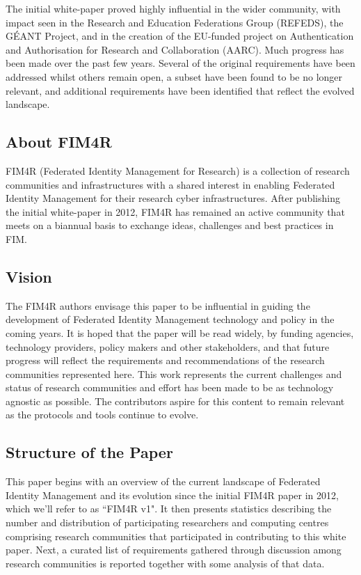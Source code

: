 \documentclass[fleqn,10pt]{wlscirep}
\begin{document}
{The initial white-paper proved highly influential in the wider community, with impact seen in the Research and Education Federations Group (REFEDS)\cite{refeds}, the GÉANT Project\cite{GN4}, and in the creation of the EU-funded project on Authentication and Authorisation for Research and Collaboration (AARC)\cite{aarc}. Much progress has been made over the past few years. Several of the original requirements have been addressed whilst others remain open, a subset have been found to be no longer relevant, and additional requirements have been identified that reflect the evolved landscape. 

\subsection{About FIM4R}
FIM4R\cite{fim4rweb} (Federated Identity Management for Research) is a collection of research communities and infrastructures with a shared interest in enabling Federated Identity Management for their research cyber infrastructures. After publishing the initial white-paper in 2012, FIM4R has remained an active community that meets on a biannual basis to exchange ideas, challenges and best practices in FIM.  

\subsection{Vision}
The FIM4R authors envisage this paper to be influential in guiding the development of Federated Identity Management technology and policy in the coming years. It is hoped that the paper will be read widely, by funding agencies, technology providers, policy makers and other stakeholders, and that future progress will reflect the requirements and recommendations of the research communities represented here. This work represents the current challenges and status of research communities and effort has been made to be as technology agnostic as possible. The contributors aspire for this content to remain relevant as the protocols and tools continue to evolve. 

\subsection{Structure of the Paper}
This paper begins with an overview of the current landscape of Federated Identity Management and its evolution since the initial FIM4R paper\cite{FIM4Rv1:2012} in 2012, which we’ll refer to as ``FIM4R v1". It then presents statistics describing the number and distribution of participating researchers and computing centres comprising research communities that participated in contributing to this white paper. Next, a curated list of requirements gathered through discussion among research communities is reported together with some analysis of that data. 

}
\end{document}
